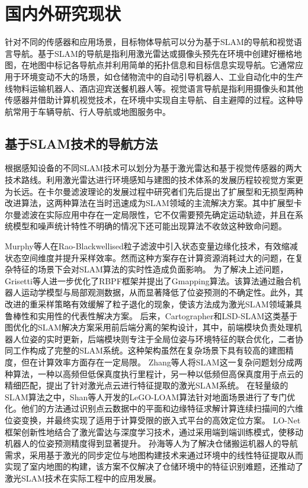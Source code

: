 \section{国内外研究现状}
    针对不同的传感器和应用场景，目标物体导航可以分为基于SLAM的导航和视觉语言导航。基于SLAM的导航是指利用激光雷达或摄像头预先在环境中创建好栅格地图，在地图中标记各导航点并利用简单的拓扑信息和目标信息实现导航。它通常应用于环境变动不大的场景，如仓储物流中的自动引导机器人、工业自动化中的生产线物料运输机器人、酒店迎宾送餐机器人等。视觉语言导航是指利用摄像头和其他传感器并借助计算机视觉技术，在环境中实现自主导航、自主避障的过程。这种导航常用于车辆导航、行人导航或地图服务中。

\subsection{基于SLAM技术的导航方法}
	
	根据感知设备的不同SLAM技术可以划分为基于激光雷达和基于视觉传感器的两大技术路线。利用激光雷达进行环境感知与建图的技术体系的发展历程较视觉方案更为长远。在卡尔曼滤波理论的发展过程中研究者们先后提出了扩展型和无损型两种改进算法，这两种算法在当时迅速成为SLAM领域的主流解决方案。其中扩展型卡尔曼滤波在实际应用中存在一定局限性，它不仅需要预先确定运动轨迹，并且在系统模型和噪声统计特性不明确的情况下还可能出现算法不收敛这种致命问题。


	Murphy\cite{murphy2001rao}等人在Rao-Blackwellised粒子滤波中引入状态变量边缘化技术，有效缩减状态空间维度并提升采样效率。然而这种方案存在计算资源消耗过大的问题，在复杂特征的场景下会对SLAM算法的实时性造成负面影响。
	为了解决上述问题，Grisetti\cite{grisetti2005improving, grisetti2007improved}等人进一步优化了RBPF框架并提出了Gmapping算法。该算法通过融合机器人运动学模型与局部观测数据，从而显著降低了位姿预测的不确定性。此外，其改进的重采样策略有效缓解了粒子退化的现象，使该方法成为激光SLAM领域兼具鲁棒性和实用性的代表性解决方案。
	后来，Cartographer\cite{hess2016real}和LSD-SLAM\cite{engel2014lsd}这类基于图优化的SLAM解决方案采用前后端分离的架构设计，其中，前端模块负责处理机器人位姿的实时更新，后端模块则专注于全局位姿与环境特征的联合优化，二者协同工作构成了完整的SLAM系统。这种架构虽然在复杂场景下具有较高的建图精度，但在计算效率方面存在一定局限。
	Zhang\cite{zhang2017low}等人将SLAM这一复杂问题划分成两种算法，一种以高频但低保真度执行里程计，另一种以低频但高保真度用于点云的精细匹配，提出了针对激光点云进行特征提取的激光SLAM系统。
	在轻量级的SLAM算法之中，Shan\cite{shan2018lego}等人开发的LeGO-LOAM算法针对地面场景进行了专门优化。他们的方法通过识别点云数据中的平面和边缘特征求解计算连续扫描间的六维位姿变换，并最终实现了适用于计算受限的嵌入式平台的高效定位方案。
	LO-Net\cite{li2019net}框架创新性地结合了激光雷达与深度学习技术，通过采用端到端训练模式，使移动机器人的位姿预测精度得到显著提升。
	孙海\cite{孙海2017激光测距在仓储搬运机器人运动中的应用}等人为了解决仓储搬运机器人的导航需求，采用基于激光的同步定位与地图构建技术来通过环境中的线性特征提取从而实现了室内地图的构建，该方案不仅解决了仓储环境中的特征识别难题，还推动了激光SLAM技术在实际工程中的应用发展。
	


